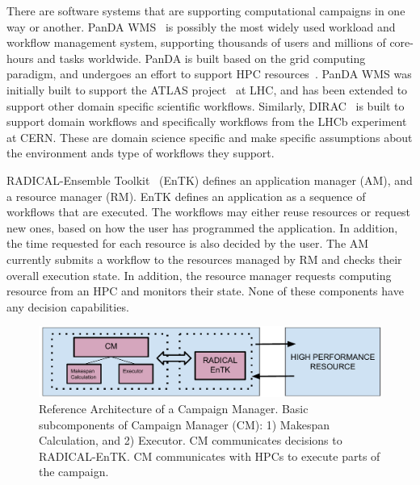 There are software systems that are supporting computational campaigns in one way or another.
PanDA WMS~\cite{maeno2008panda,maeno2014evolution} is possibly the most widely used workload and workflow management system, supporting thousands of users and millions of core-hours and tasks worldwide.
PanDA is built based on the grid computing paradigm, and undergoes an effort to support HPC resources~\cite{de2016accelerating}.
PanDA WMS was initially built to support the ATLAS project~\cite{atlas} at LHC, and has been extended to support other domain specific scientific workflows.
Similarly, DIRAC~\cite{casajus2010dirac} is built to support domain workflows and specifically workflows from the LHCb experiment at CERN.
These are domain science specific and make specific assumptions about the environment ands type of workflows they support.






RADICAL-Ensemble Toolkit~\cite{balasubramanian2018harnessing} (EnTK) defines 
an application manager (AM), and a resource manager (RM). EnTK defines an 
application as a sequence of workflows that are executed. The workflows may 
either reuse resources or request new ones, based on how the user has 
programmed the application. In addition, the time requested for each resource 
is also decided by the user. The AM currently submits a workflow to the 
resources managed by RM and checks their overall execution state. In addition,
 the resource manager requests computing resource from an HPC and monitors 
their state. None of these components have any decision capabilities.

\begin{figure}[t]
    \centering
    \includegraphics[width=.95\textwidth]{figures/CEM_RefArch.pdf}
    \caption{Reference Architecture of a Campaign Manager. Basic 
    subcomponents of Campaign Manager (CM): 1) Makespan Calculation, and 2) Executor. 
    CM communicates decisions to RADICAL-EnTK. CM communicates with HPCs to 
    execute parts of the campaign.\vspace{-2.5ex}}\label{refarch}
\end{figure}


